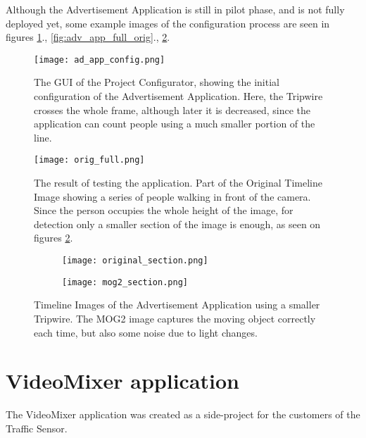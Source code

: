 Although the Advertisement Application is still in pilot phase, and is not fully deployed yet, some example images of the configuration process are seen in figures \ref{fig:adv_app_config}., \ref{fig:adv_app_full_orig}., \ref{fig:adv_app_counting}.

\begin{figure}[!h]
	\centering
	\texttt{[image: ad\_app\_config.png]}
	
	\caption[Initial configuration settings of the Advertisement Application]{The GUI of the Project Configurator, showing the initial configuration of the Advertisement Application. Here, the Tripwire crosses the whole frame, although later it is decreased, since the application can count people using a much smaller portion of the line.  \label{fig:adv_app_config}}
\end{figure}

\begin{figure}[!h]
	\centering
	\texttt{[image: orig\_full.png]}
	
	\caption[Test result of the Advertisement Application. (Whole height of the image is used.)]{The result of testing the application. Part of the Original Timeline Image showing a series of people walking in front of the camera. Since the person occupies the whole height of the image, for detection only a smaller section of the image is enough, as seen on figures \ref{fig:adv_app_counting}.}
\end{figure}

\begin{figure}[!h]
	\centering
	\begin{subfigure}[t]{0.6\textwidth}
	\texttt{[image: original\_section.png]}
	\end{subfigure}
	\hfill
	\begin{subfigure}[t]{0.6\textwidth}
		\texttt{[image: mog2\_section.png]}
	\end{subfigure}

	\caption[Test result of the Advertisement Application. (Only a small Tripwire section is used)]{Timeline Images of the Advertisement Application using a smaller Tripwire. The MOG2 image captures the moving object correctly each time, but also some noise due to light changes.\label{fig:adv_app_counting}}
\end{figure}

\clearpage\section{VideoMixer application}
The VideoMixer application was created as a side-project for the customers of the Traffic Sensor.

